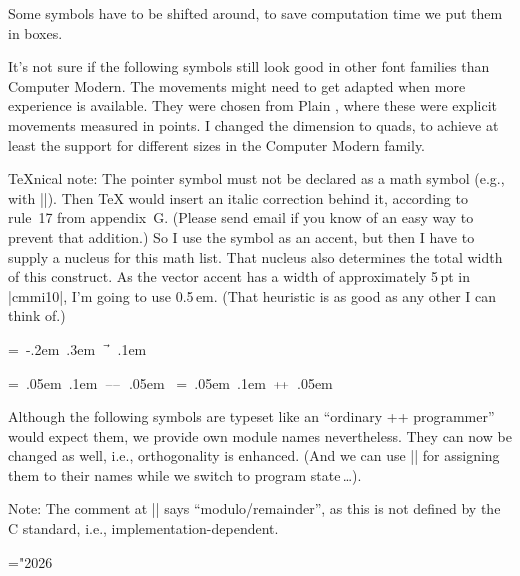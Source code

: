 \documentclass{progltx}
\begin{document}
\sect Some symbols have to be shifted around, to save computation time
we put them in boxes.

\begin{fixme}
  It's not sure if the following symbols still look good in other font
  families than Computer Modern. The movements might need to get
  adapted when more experience is available. They were chosen from
  Plain \cweb{}, where these were explicit movements measured in
  points. I changed the dimension to quads, to achieve at least the
  support for different sizes in the Computer Modern family.
\end{fixme}

\TeX{}nical note: The pointer symbol must not be declared as a math
symbol (e.g., with |\DeclareMathSymbol|). Then \TeX{} would insert an
italic correction behind it, according to rule~17 from appendix~G.
(Please send email if you know of an easy way to prevent that
addition.) So I use the symbol as an accent, but then I have to supply
a nucleus for this math list. That nucleus also determines the total
width of this construct. As the vector accent has a width of
approximately 5\,pt in |cmmi10|, I'm going to use 0.5\,em. (That
heuristic is as good as any other I can think of.)

\beginprog
\newbox\cwbb@pointer
\setbox\cwbb@pointer=\hbox{%
	    \kern -.2em
	    \lower .3em \hbox{$\vec{\kern .5em}$}%
	    \kern .1em
	    }

\newbox\cwbb@decr		%
\setbox\cwbb@decr=\hbox{%
	    \kern .05em
	    \raise .1em \hbox{$\scriptstyle {-}\kern -.1em{-}$}%
	    \kern .05em
	    }
\newbox\cwbb@incr		%
\setbox\cwbb@incr=\hbox{%
	    \kern .05em
	    \raise .1em \hbox{$\scriptstyle {+}\kern -.1em{+}$}%
	    \kern .05em
	    }
\endprog


\sect Although the following symbols are typeset like an ``ordinary
\C++ programmer'' would expect them, we provide own module names
nevertheless. They can now be changed as well, i.e., orthogonality is
enhanced. (And we can use |\cwbb@rebind| for assigning them to their
names while we switch to program state\,\dots).

Note: The comment at |\CwebMod| says ``modulo/remainder'', as this is
not defined by the C standard, i.e., implementation-dependent.

\beginprog
\mathchardef\CwebAddress="2026	%
\let\CwebAssign==		%
\let\CwebBinOr=\mid		%
\def\CwebComplement{{\sim}}	%
\def\CwebDecr{\copy\cwbb@decr}	%
\def\CwebIncr{\copy\cwbb@incr}	%
\let\CwebLeftShift=\ll		%
\def\CwebMod{\mathbin{\hbox{\footnotesize\rm\%}}}	%
\def\CwebMemberRef{\mathbin{.*}}	%
\def\CwebPointer{\copy\cwbb@pointer}
\def\CwebPointerMemberRef{\mathbin{\CwebPointer*}} %
\def\CwebRel{\mathrel?}		%
\let\CwebRightShift=\gg		%
\def\CwebScope{\kern.1em{::}\kern.1em}	%
\end{document}
